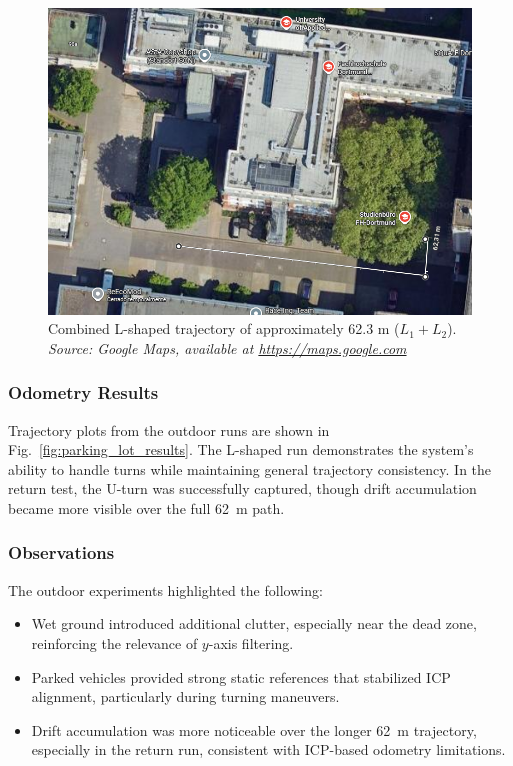 \begin{figure}[!htbp]
    \centering
    \includegraphics[width=0.9\linewidth]{images/FH_ParkingLot_TotalDistance.png}
    \caption{Combined L-shaped trajectory of approximately 62.3 m ($L_1 + L_2$).\\
    \textit{Source: Google Maps, available at \url{https://maps.google.com} \cite{googlemaps_fhdo}}}
    \label{fig:parkinglot_totaldistance}
\end{figure}

\subsubsection{Odometry Results}
Trajectory plots from the outdoor runs are shown in Fig.~\ref{fig:parking_lot_results}.  
The L-shaped run demonstrates the system's ability to handle turns while maintaining general trajectory consistency.  
In the return test, the U-turn was successfully captured, though drift accumulation became more visible over the full \SI{62}{\meter} path.

\subsubsection{Observations}
The outdoor experiments highlighted the following:
\begin{itemize}
    \item Wet ground introduced additional clutter, especially near the dead zone, reinforcing the relevance of $y$-axis filtering.
    \item Parked vehicles provided strong static references that stabilized ICP alignment, particularly during turning maneuvers.
    \item Drift accumulation was more noticeable over the longer \SI{62}{\meter} trajectory, especially in the return run, consistent with ICP-based odometry limitations.
\end{itemize}

